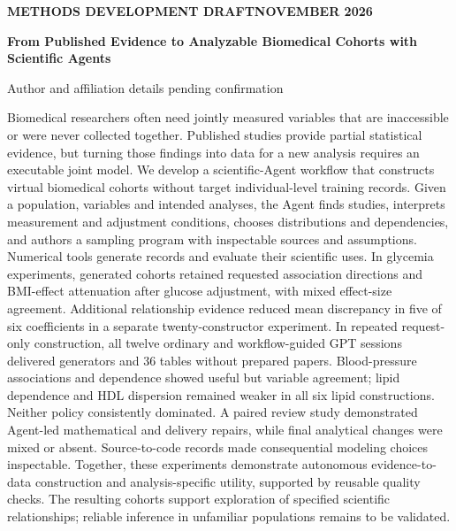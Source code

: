\documentclass[11pt,letterpaper]{article}
\renewenvironment{abstract}{\small\par\noindent{\sffamily\bfseries\color{ink}Abstract}\quad\ignorespaces}{\par\medskip}
\begin{document}
\thispagestyle{plain}
{\sffamily\footnotesize\color{accent}\bfseries METHODS DEVELOPMENT DRAFT\quad\textbar\quad NOVEMBER 2026\par}
\vspace{.7em}
{\raggedright\sffamily\bfseries\fontsize{24}{29}\selectfont\color{ink}From Published Evidence to Analyzable Biomedical Cohorts with Scientific Agents\par}
\vspace{.5em}
{\small Author and affiliation details pending confirmation\par}
\vspace{.7em}
\begin{abstract}

Biomedical researchers often need jointly measured variables that are inaccessible or were never collected together. Published studies provide partial statistical evidence, but turning those findings into data for a new analysis requires an executable joint model. We develop a scientific-Agent workflow that constructs virtual biomedical cohorts without target individual-level training records. Given a population, variables and intended analyses, the Agent finds studies, interprets measurement and adjustment conditions, chooses distributions and dependencies, and authors a sampling program with inspectable sources and assumptions. Numerical tools generate records and evaluate their scientific uses. In glycemia experiments, generated cohorts retained requested association directions and BMI-effect attenuation after glucose adjustment, with mixed effect-size agreement. Additional relationship evidence reduced mean discrepancy in five of six coefficients in a separate twenty-constructor experiment. In repeated request-only construction, all twelve ordinary and workflow-guided GPT sessions delivered generators and 36 tables without prepared papers. Blood-pressure associations and dependence showed useful but variable agreement; lipid dependence and HDL dispersion remained weaker in all six lipid constructions. Neither policy consistently dominated. A paired review study demonstrated Agent-led mathematical and delivery repairs, while final analytical changes were mixed or absent. Source-to-code records made consequential modeling choices inspectable. Together, these experiments demonstrate autonomous evidence-to-data construction and analysis-specific utility, supported by reusable quality checks. The resulting cohorts support exploration of specified scientific relationships; reliable inference in unfamiliar populations remains to be validated.

\end{abstract}
\end{document}
